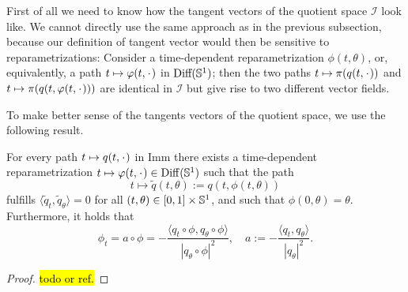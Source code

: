 First of all we need to know how the tangent vectors of the quotient space $\mathcal{I}$ look like. We cannot directly use the same approach as in the previous subsection, because our definition of tangent vector would then be
sensitive to reparametrizations: Consider a time-dependent
reparametrization $\phi(t,\theta)$, or, equivalently, a path $t \mapsto \phi(t,
\blank)$ in $\text{Diff}(\S^1)$; then the two paths $t \mapsto
\pi(q(t, \blank))$ and $t \mapsto \pi(q(t, \phi(t, \blank)))$ are
identical in $\mathcal{I}$ but give rise to two different vector fields.

To make better sense of the tangents vectors of the quotient space, we
use the following result.

\begin{proposition}
  \label{prop:horizontal-path}
  For every path $t \mapsto q(t, \blank)$ in $\mathrm{Imm}$ there exists a
  time-dependent reparametrization $t \mapsto \phi(t, \blank) \in
  \mathrm{Diff}(\S^{1})$ such that the path
  \begin{equation*}
    t \mapsto \tilde{q}(t, \theta):=q(t, \phi(t,\theta))
  \end{equation*}
  fulfills
  $\langle \tilde{q}_t, \tilde{q}_{\theta}\rangle=0$ for all $(t,\theta) \in [0,1]\times \S^1$, and such that $\phi(0, \theta)=\theta$. Furthermore, it holds that
  \begin{equation}
    \label{eq:canon-repar}
    \phi_t = a \circ \phi
    = -\frac{\langle q_t \circ \phi, q_{\theta} \circ \phi\rangle}{|q_{\theta}\circ \phi|^2},
    \quad a := -\frac{\langle q_t,
      q_{\theta}\rangle}{|q_{\theta}|^2}.
  \end{equation}
\end{proposition}

\begin{proof}
  \hl{todo or ref.}
\end{proof}

